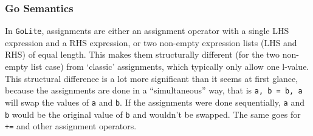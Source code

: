 \documentclass[11pt]{article}
\begin{document}
\subsubsection{Go Semantics}
\label{sec:orgb465ec5}
In \texttt{GoLite}, assignments are either an assignment operator with a
single LHS expression and a RHS expression, or two non-empty
expression lists (LHS and RHS) of equal length. This makes them structurally
different (for the two non-empty list case) from `classic'
assignments, which typically only allow one l-value.
This structural difference is a lot more significant than it seems
at first glance, because the assignments are done in a ``simultaneous''
way, that is \texttt{a, b = b, a} will swap the values of \texttt{a} and \texttt{b}. If the
assignments were done sequentially, \texttt{a} and \texttt{b} would be the
original value of \texttt{b} and wouldn't be swapped. The same goes for \texttt{+=} and
other assignment operators.
\end{document}
